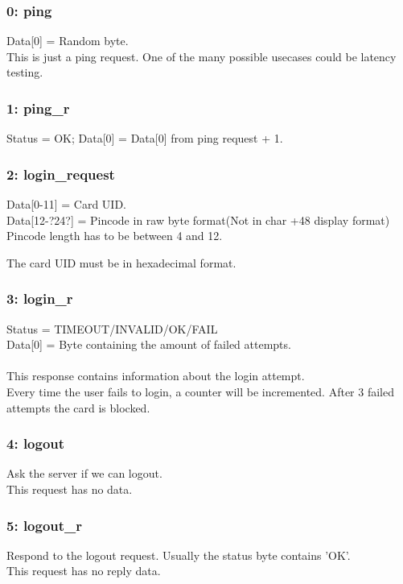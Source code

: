 \documentclass[12pt, a4paper]{article}
\begin{document}
\subsubsection{0: ping}
Data[0] = Random byte.\\

This is just a ping request. One of the many possible usecases could be latency testing.

\subsubsection{1: ping\_r}
Status = OK;
Data[0] = Data[0] from ping request + 1.

\subsubsection{2: login\_request}
Data[0-11] = Card UID.\\
Data[12-?24?] = Pincode in raw byte format(Not in char +48 display format)\\
Pincode length has to be between 4 and 12.

The card UID must be in hexadecimal format.\\

\subsubsection{3: login\_r}
Status = TIMEOUT/INVALID/OK/FAIL\\
Data[0] = Byte containing the amount of failed attempts.\\
\\
This response contains information about the login attempt.\\
Every time the user fails to login, a counter will be incremented.
After 3 failed attempts the card is blocked.

\subsubsection{4: logout}
Ask the server if we can logout.\\
This request has no data.

\subsubsection{5: logout\_r}
Respond to the logout request. Usually the status byte contains 'OK'.\\
This request has no reply data.
\end{document}
